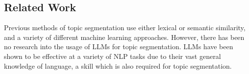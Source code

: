 \subsection{Related Work}

Previous methods of topic segmentation use either lexical or semantic similarity, and a variety of different machine learning approaches. However, there has been no research into the usage of LLMs for topic segmentation. LLMs have been shown to be effective at a variety of NLP tasks due to their vast general knowledge of language, a skill which is also required for topic segmentation.
